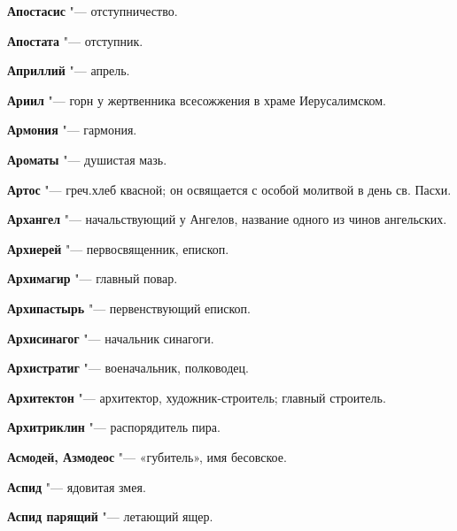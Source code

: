 \begin{mymulticols}{2}
\noindent\textbf{Апостасис} "--- отступничество. 




\noindent\textbf{Апостата} "--- отступник. 




\noindent\textbf{Априллий} "--- апрель. 




\noindent\textbf{Ариил} "--- горн у жертвенника всесожжения в храме Иерусалимском. 




\noindent\textbf{Армония} "--- гармония. 




\noindent\textbf{Ароматы} "--- душистая мазь. 




\noindent\textbf{Артос} "--- греч.хлеб квасной; он освящается с особой молитвой в день св. Пасхи. 




\noindent\textbf{Архангел} "--- начальствующий у Ангелов, название одного из чинов ангельских. 




\noindent\textbf{Архиерей} "--- первосвященник, епископ. 




\noindent\textbf{Архимагир} "--- главный повар. 




\noindent\textbf{Архипастырь} "--- первенствующий епископ. 




\noindent\textbf{Архисинагог} "--- начальник синагоги. 




\noindent\textbf{Архистратиг} "--- военачальник, полководец. 




\noindent\textbf{Архитектон} "--- архитектор, художник-строитель; главный строитель. 




\noindent\textbf{Архитриклин} "--- распорядитель пира. 




\noindent\textbf{Асмодей, Азмодеос} "--- «губитель», имя бесовское. 




\noindent\textbf{Аспид} "--- ядовитая змея. 




\noindent\textbf{Аспид парящий} "--- летающий ящер. 





\end{mymulticols}
